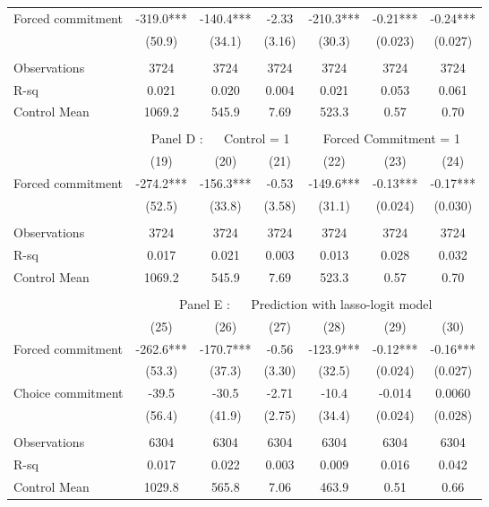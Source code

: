 \begin{tabular}{lcccccc}
\midrule
\midrule
Forced commitment  & -319.0*** & -140.4*** & -2.33 & -210.3*** & -0.21*** & -0.24*** \\
      & (50.9) & (34.1) & (3.16) & (30.3) & (0.023) & (0.027) \\
      &       &       &       &       &       &  \\
\midrule
Observations & 3724  & 3724  & 3724  & 3724  & 3724  & 3724 \\
R-sq  & 0.021 & 0.020 & 0.004 & 0.021 & 0.053 & 0.061 \\
Control Mean & 1069.2 & 545.9 & 7.69  & 523.3 & 0.57  & 0.70 \\
\midrule
\midrule
      &       &       &       &       &       &  \\
\midrule
      & \multicolumn{6}{c}{Panel D : $\quad$ Control  = 1       $\quad\quad$                      Forced Commitment = 1} \\
\midrule
\midrule
      & (19)  & (20)  & (21)  & (22)  & (23)  & (24) \\
\midrule
\midrule
Forced commitment  & -274.2*** & -156.3*** & -0.53 & -149.6*** & -0.13*** & -0.17*** \\
      & (52.5) & (33.8) & (3.58) & (31.1) & (0.024) & (0.030) \\
      &       &       &       &       &       &  \\
\midrule
Observations & 3724  & 3724  & 3724  & 3724  & 3724  & 3724 \\
R-sq  & 0.017 & 0.021 & 0.003 & 0.013 & 0.028 & 0.032 \\
Control Mean & 1069.2 & 545.9 & 7.69  & 523.3 & 0.57  & 0.70 \\
\midrule
\midrule
      &       &       &       &       &       &  \\
\midrule
      & \multicolumn{6}{c}{Panel E : $\quad$ Prediction with lasso-logit model} \\
\midrule
\midrule
      & (25)  & (26)  & (27)  & (28)  & (29)  & (30) \\
\midrule
\midrule
Forced commitment  & -262.6*** & -170.7*** & -0.56 & -123.9*** & -0.12*** & -0.16*** \\
      & (53.3) & (37.3) & (3.30) & (32.5) & (0.024) & (0.027) \\
Choice commitment & -39.5 & -30.5 & -2.71 & -10.4 & -0.014 & 0.0060 \\
      & (56.4) & (41.9) & (2.75) & (34.4) & (0.024) & (0.028) \\
      &       &       &       &       &       &  \\
\midrule
Observations & 6304  & 6304  & 6304  & 6304  & 6304  & 6304 \\
R-sq  & 0.017 & 0.022 & 0.003 & 0.009 & 0.016 & 0.042 \\
Control Mean & 1029.8 & 565.8 & 7.06  & 463.9 & 0.51  & 0.66 \\
\bottomrule
\bottomrule
\end{tabular}%
